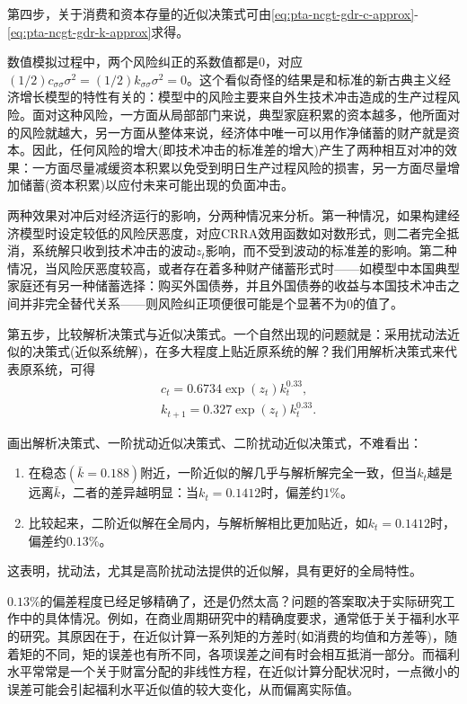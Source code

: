 第四步，关于消费和资本存量的近似决策式可由\eqref{eq:pta-ncgt-gdr-c-approx}-\eqref{eq:pta-ncgt-gdr-k-approx}求得。

\begin{remark}[风险纠正系数的讨论]
  \label{remark:correction-for-risk}
  数值模拟过程中，两个风险纠正的系数值都是$0$，对应$(1/2)c_{\sigma \sigma} \sigma^2 = (1/2)k_{\sigma \sigma} \sigma^2 =0$。这个看似奇怪的结果是和标准的新古典主义经济增长模型的特性有关的：模型中的风险主要来自外生技术冲击造成的生产过程风险。面对这种风险，一方面从局部部门来说，典型家庭积累的资本越多，他所面对的风险就越大，另一方面从整体来说，经济体中唯一可以用作净储蓄的财产就是资本。因此，任何风险的增大(即技术冲击的标准差的增大)产生了两种相互对冲的效果：一方面尽量减缓资本积累以免受到明日生产过程风险的损害，另一方面尽量增加储蓄(资本积累)以应付未来可能出现的负面冲击。

  两种效果对冲后对经济运行的影响，分两种情况来分析。第一种情况，如果构建经济模型时设定较低的风险厌恶度，对应CRRA效用函数如对数形式，则二者完全抵消，系统解只收到技术冲击的波动$z_t$影响，而不受到波动的标准差的影响。第二种情况，当风险厌恶度较高，或者存在着多种财产储蓄形式时——如模型中本国典型家庭还有另一种储蓄选择：购买外国债券，并且外国债券的收益与本国技术冲击之间并非完全替代关系——则风险纠正项便很可能是个显著不为0的值了。
\end{remark}

第五步，比较解析决策式与近似决策式。一个自然出现的问题就是：采用扰动法近似的决策式(近似系统解)，在多大程度上贴近原系统的解？我们用解析决策式来代表原系统，可得
\begin{equation*}
  \begin{split}
    &c_t = 0.6734 \exp(z_t) k_t^{0.33}, \\
    &k_{t+1} = 0.327 \exp(z_t) k_t^{0.33}.
  \end{split}
\end{equation*}

画出解析决策式、一阶扰动近似决策式、二阶扰动近似决策式，不难看出：
\begin{enumerate}
  \item 在稳态$(\bar{k}=0.188)$附近，一阶近似的解几乎与解析解完全一致，但当$k_t$越是远离$\bar{k}$，二者的差异越明显：当$k_t=0.1412$时，偏差约$1\%$。
  \item 比较起来，二阶近似解在全局内，与解析解相比更加贴近，如$k_t=0.1412$时，偏差约$0.13\%$。
\end{enumerate}
这表明，扰动法，尤其是高阶扰动法提供的近似解，具有更好的全局特性。

\begin{remark}[扰动近似解的精确度检验]
  $0.13\%$的偏差程度已经足够精确了，还是仍然太高？问题的答案取决于实际研究工作中的具体情况。例如，在商业周期研究中的精确度要求，通常低于关于福利水平的研究。其原因在于，在近似计算一系列矩的方差时(如消费的均值和方差等)，随着矩的不同，矩的误差也有所不同，各项误差之间有时会相互抵消一部分。而福利水平常常是一个关于财富分配的非线性方程，在近似计算分配状况时，一点微小的误差可能会引起福利水平近似值的较大变化，从而偏离实际值。
\end{remark}

